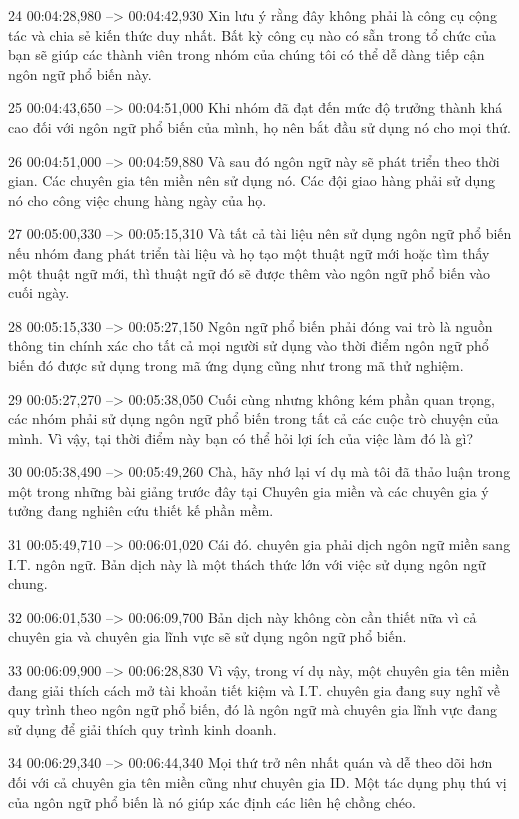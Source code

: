 24
00:04:28,980 --> 00:04:42,930
Xin lưu ý rằng đây không phải là công cụ cộng tác và chia sẻ kiến ​​thức duy nhất.  Bất kỳ công cụ nào có sẵn trong tổ chức của bạn sẽ giúp các thành viên trong nhóm của chúng tôi có thể dễ dàng tiếp cận ngôn ngữ phổ biến này.

25
00:04:43,650 --> 00:04:51,000
Khi nhóm đã đạt đến mức độ trưởng thành khá cao đối với ngôn ngữ phổ biến của mình, họ nên bắt đầu sử dụng nó cho mọi thứ.

26
00:04:51,000 --> 00:04:59,880
Và sau đó ngôn ngữ này sẽ phát triển theo thời gian.  Các chuyên gia tên miền nên sử dụng nó.  Các đội giao hàng phải sử dụng nó cho công việc chung hàng ngày của họ.

27
00:05:00,330 --> 00:05:15,310
Và tất cả tài liệu nên sử dụng ngôn ngữ phổ biến nếu nhóm đang phát triển tài liệu và họ tạo một thuật ngữ mới hoặc tìm thấy một thuật ngữ mới, thì thuật ngữ đó sẽ được thêm vào ngôn ngữ phổ biến vào cuối ngày.

28
00:05:15,330 --> 00:05:27,150
Ngôn ngữ phổ biến phải đóng vai trò là nguồn thông tin chính xác cho tất cả mọi người sử dụng vào thời điểm ngôn ngữ phổ biến đó được sử dụng trong mã ứng dụng cũng như trong mã thử nghiệm.

29
00:05:27,270 --> 00:05:38,050
Cuối cùng nhưng không kém phần quan trọng, các nhóm phải sử dụng ngôn ngữ phổ biến trong tất cả các cuộc trò chuyện của mình.  Vì vậy, tại thời điểm này bạn có thể hỏi lợi ích của việc làm đó là gì?

30
00:05:38,490 --> 00:05:49,260
Chà, hãy nhớ lại ví dụ mà tôi đã thảo luận trong một trong những bài giảng trước đây tại Chuyên gia miền và các chuyên gia ý tưởng đang nghiên cứu thiết kế phần mềm.

31
00:05:49,710 --> 00:06:01,020
Cái đó.  chuyên gia phải dịch ngôn ngữ miền sang I.T.  ngôn ngữ.  Bản dịch này là một thách thức lớn với việc sử dụng ngôn ngữ chung.

32
00:06:01,530 --> 00:06:09,700
Bản dịch này không còn cần thiết nữa vì cả chuyên gia và chuyên gia lĩnh vực sẽ sử dụng ngôn ngữ phổ biến.

33
00:06:09,900 --> 00:06:28,830
Vì vậy, trong ví dụ này, một chuyên gia tên miền đang giải thích cách mở tài khoản tiết kiệm và I.T.  chuyên gia đang suy nghĩ về quy trình theo ngôn ngữ phổ biến, đó là ngôn ngữ mà chuyên gia lĩnh vực đang sử dụng để giải thích quy trình kinh doanh.

34
00:06:29,340 --> 00:06:44,340
Mọi thứ trở nên nhất quán và dễ theo dõi hơn đối với cả chuyên gia tên miền cũng như chuyên gia ID.  Một tác dụng phụ thú vị của ngôn ngữ phổ biến là nó giúp xác định các liên hệ chồng chéo.

